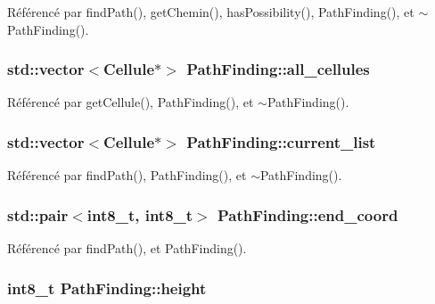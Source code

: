 Référencé par find\-Path(), get\-Chemin(), has\-Possibility(), Path\-Finding(), et $\sim$\-Path\-Finding().

\hypertarget{classPathFinding_ae2eff9f0d9ffba2d88d405d10c34660a}{
\subsubsection[{all\-\_\-cellules}]{\setlength{\rightskip}{0pt plus 5cm}std\-::vector$<${\bf Cellule}$\ast$$>$ Path\-Finding\-::all\-\_\-cellules\hspace{0.3cm}{\ttfamily [private]}}}\label{classPathFinding_ae2eff9f0d9ffba2d88d405d10c34660a}


Référencé par get\-Cellule(), Path\-Finding(), et $\sim$\-Path\-Finding().

\hypertarget{classPathFinding_aac0f1388f79b45388470d634c909174e}{
\subsubsection[{current\-\_\-list}]{\setlength{\rightskip}{0pt plus 5cm}std\-::vector$<${\bf Cellule}$\ast$$>$ Path\-Finding\-::current\-\_\-list\hspace{0.3cm}{\ttfamily [private]}}}\label{classPathFinding_aac0f1388f79b45388470d634c909174e}


Référencé par find\-Path(), Path\-Finding(), et $\sim$\-Path\-Finding().

\hypertarget{classPathFinding_a7db7c62b00778fb60be8fdb10c471851}{
\subsubsection[{end\-\_\-coord}]{\setlength{\rightskip}{0pt plus 5cm}std\-::pair$<$int8\-\_\-t, int8\-\_\-t$>$ Path\-Finding\-::end\-\_\-coord\hspace{0.3cm}{\ttfamily [private]}}}\label{classPathFinding_a7db7c62b00778fb60be8fdb10c471851}


Référencé par find\-Path(), et Path\-Finding().

\hypertarget{classPathFinding_a61e5643d7459d24b07306a6886348ca1}{
\subsubsection[{height}]{\setlength{\rightskip}{0pt plus 5cm}int8\-\_\-t Path\-Finding\-::height\hspace{0.3cm}{\ttfamily [private]}}}\label{classPathFinding_a61e5643d7459d24b07306a6886348ca1}


